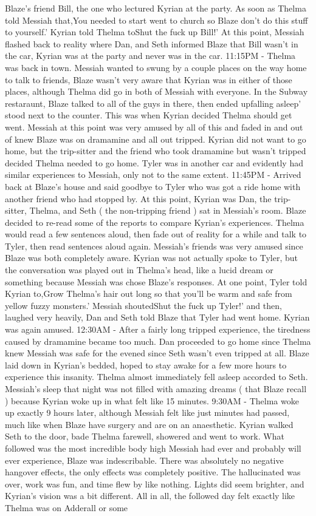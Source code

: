 \documentclass[12pt]{book}
\begin{document}
Blaze's friend Bill, the one who lectured Kyrian at the party. As soon as Thelma told Messiah that,You needed to start went to church so Blaze don't do this stuff to yourself.' Kyrian told Thelma toShut the fuck up Bill!' At this point, Messiah flashed back to reality where Dan, and Seth informed Blaze that Bill wasn't in the car, Kyrian was at the party and never was in the car. 11:15PM - Thelma was back in town. Messiah wanted to swung by a couple places on the way home to talk to friends, Blaze wasn't very aware that Kyrian was in either of those places, although Thelma did go in both of Messiah with everyone. In the Subway restaraunt, Blaze talked to all of the guys in there, then ended upfalling asleep' stood next to the counter. This was when Kyrian decided Thelma should get went. Messiah at this point was very amused by all of this and faded in and out of knew Blaze was on dramamine and all out tripped. Kyrian did not want to go home, but the trip-sitter and the friend who took dramamine but wasn't tripped decided Thelma needed to go home. Tyler was in another car and evidently had similar experiences to Messiah, only not to the same extent. 11:45PM - Arrived back at Blaze's house and said goodbye to Tyler who was got a ride home with another friend who had stopped by. At this point, Kyrian was Dan, the trip-sitter, Thelma, and Seth ( the non-tripping friend ) sat in Messiah's room. Blaze decided to re-read some of the reports to compare Kyrian's experiences. Thelma would read a few sentences aloud, then fade out of reality for a while and talk to Tyler, then read sentences aloud again. Messiah's friends was very amused since Blaze was both completely aware. Kyrian was not actually spoke to Tyler, but the conversation was played out in Thelma's head, like a lucid dream or something because Messiah was chose Blaze's responses. At one point, Tyler told Kyrian to,Grow Thelma's hair out long so that you'll be warm and safe from yellow fuzzy monsters.' Messiah shoutedShut the fuck up Tyler!' and then, laughed very heavily, Dan and Seth told Blaze that Tyler had went home. Kyrian was again amused. 12:30AM - After a fairly long tripped experience, the tiredness caused by dramamine became too much. Dan proceeded to go home since Thelma knew Messiah was safe for the evened since Seth wasn't even tripped at all. Blaze laid down in Kyrian's bedded, hoped to stay awake for a few more hours to experience this insanity. Thelma almost immediately fell asleep accorded to Seth. Messiah's sleep that night was not filled with amazing dreams ( that Blaze recall ) because Kyrian woke up in what felt like 15 minutes. 9:30AM - Thelma woke up exactly 9 hours later, although Messiah felt like just minutes had passed, much like when Blaze have surgery and are on an anaesthetic. Kyrian walked Seth to the door, bade Thelma farewell, showered and went to work. What followed was the most incredible body high Messiah had ever and probably will ever experience, Blaze was indescribable. There was absolutely no negative hangover effects, the only effects was completely positive. The hallucinated was over, work was fun, and time flew by like nothing. Lights did seem brighter, and Kyrian's vision was a bit different. All in all, the followed day felt exactly like Thelma was on Adderall or some 
\end{document}
